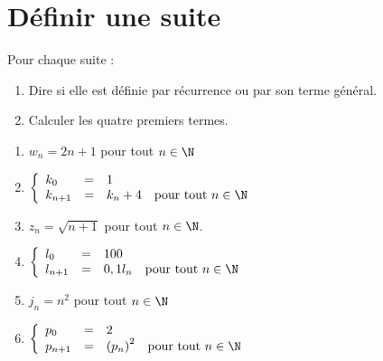 \documentclass[a4paper,11pt,exos]{nsi} %
\begin{document}
\maketitle

\setlength{\columnseprule}{0pt}
\setlength{\columnsep}{30pt}


\section*{Définir une suite}

Pour chaque suite :
\begin{enumerate}[label=\textbullet]
	\item 	Dire si elle est définie par récurrence ou par son terme général.
	\item 	Calculer les quatre premiers termes.
\end{enumerate}
\begin{multicols}{2}
	\begin{enumerate}
		\item 	$w_n=2n+1$ pour tout $n\in\N$\\
		
		\item 	$\left\{
		\begin{array}{llll}
			k_0 & = & 1 & \\
			k_{n+1} & = & k_n+4 & \text{pour tout } n\in\N\\
		\end{array}
		\right. $\\
		
		\item 	$z_n=\sqrt{n+1}$ pour tout $n\in\N$.\\
		
		\item 	$\left\{
		\begin{array}{llll}
			l_0 & = & 100 & \\
			l_{n+1} & = & 0,1l_n & \text{pour tout } n\in\N\\
		\end{array}
		\right. $\\
		
		\item 	$j_n=n^2$ pour tout $n\in\N$\\
		
		\item 	$\left\{
		\begin{array}{llll}
			p_0 & = & 2 & \\
			p_{n+1} & = & \left(p_n\right)^2& \text{pour tout } n\in\N\\
		\end{array}
		\right. $\\
	\end{enumerate}
\end{multicols}
\end{document}
